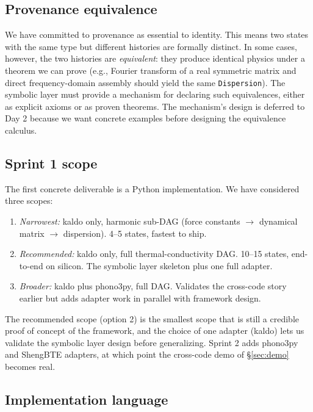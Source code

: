 \documentclass[11pt,a4paper]{article}
\begin{document}
\subsection{Provenance equivalence}

We have committed to provenance as essential to identity. This means two states with the same
type but different histories are formally distinct. In some cases, however, the two histories are
\emph{equivalent}: they produce identical physics under a theorem we can prove (e.g., Fourier
transform of a real symmetric matrix and direct frequency-domain assembly should yield the same
\texttt{Dispersion}). The symbolic layer must provide a mechanism for declaring such equivalences,
either as explicit axioms or as proven theorems. The mechanism's design is deferred to Day 2
because we want concrete examples before designing the equivalence calculus.

\subsection{Sprint 1 scope}

The first concrete deliverable is a Python implementation. We have considered three scopes:

\begin{enumerate}[leftmargin=2em]
  \item \emph{Narrowest:} kaldo only, harmonic sub-DAG (force constants $\to$ dynamical matrix
        $\to$ dispersion). 4--5 states, fastest to ship.
  \item \emph{Recommended:} kaldo only, full thermal-conductivity DAG. 10--15 states, end-to-end
        on silicon. The symbolic layer skeleton plus one full adapter.
  \item \emph{Broader:} kaldo plus phono3py, full DAG. Validates the cross-code story earlier but
        adds adapter work in parallel with framework design.
\end{enumerate}

The recommended scope (option 2) is the smallest scope that is still a credible proof of concept
of the framework, and the choice of one adapter (kaldo) lets us validate the symbolic layer design
before generalizing. Sprint 2 adds phono3py and ShengBTE adapters, at which point the cross-code
demo of \S\ref{sec:demo} becomes real.

\subsection{Implementation language}
\end{document}
